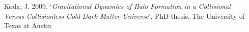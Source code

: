 


\renewcommand{\refname}{PhD Thesis}
\begin{thebibliography}{8}
{Koda}, J. 2009, `{\it Gravitational Dynamics of Halo Formation in a Collisional
  Versus Collisionless Cold Dark Matter Universe}', PhD thesis, The University
  of Texas at Austin
\end{thebibliography}





